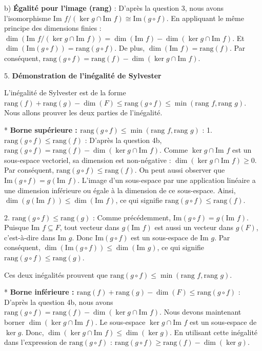 \documentclass{report}
\begin{document}
    b) \textbf{Égalité pour l'image (rang)} :
        D'après la question 3, nous avons l'isomorphisme $\text{Im } f / (\ker g \cap \text{Im } f) \cong \text{Im}(g \circ f)$.
        En appliquant le même principe des dimensions finies :
        $\dim(\text{Im } f / (\ker g \cap \text{Im } f)) = \dim(\text{Im } f) - \dim(\ker g \cap \text{Im } f)$.
        Et $\dim(\text{Im}(g \circ f)) = \text{rang}(g \circ f)$.
        De plus, $\dim(\text{Im } f) = \text{rang}(f)$.
        Par conséquent, $\text{rang}(g \circ f) = \text{rang}(f) - \dim(\ker g \cap \text{Im } f)$.

5.  \textbf{Démonstration de l'inégalité de Sylvester}

    L'inégalité de Sylvester est de la forme $\text{rang}(f) + \text{rang}(g) - \dim(F) \le \text{rang}(g \circ f) \le \min(\text{rang } f, \text{rang } g)$.
    Nous allons prouver les deux parties de l'inégalité.

    *   \textbf{Borne supérieure : $\text{rang}(g \circ f) \le \min(\text{rang } f, \text{rang } g)$} :
        1.  \textbf{$\text{rang}(g \circ f) \le \text{rang}(f)$} :
            D'après la question 4b, $\text{rang}(g \circ f) = \text{rang}(f) - \dim(\ker g \cap \text{Im } f)$.
            Comme $\ker g \cap \text{Im } f$ est un sous-espace vectoriel, sa dimension est non-négative : $\dim(\ker g \cap \text{Im } f) \ge 0$.
            Par conséquent, $\text{rang}(g \circ f) \le \text{rang}(f)$.
            On peut aussi observer que $\text{Im}(g \circ f) = g(\text{Im } f)$. L'image d'un sous-espace par une application linéaire a une dimension inférieure ou égale à la dimension de ce sous-espace. Ainsi, $\dim(g(\text{Im } f)) \le \dim(\text{Im } f)$, ce qui signifie $\text{rang}(g \circ f) \le \text{rang}(f)$.

        2.  \textbf{$\text{rang}(g \circ f) \le \text{rang}(g)$} :
            Comme précédemment, $\text{Im}(g \circ f) = g(\text{Im } f)$.
            Puisque $\text{Im } f \subseteq F$, tout vecteur dans $g(\text{Im } f)$ est aussi un vecteur dans $g(F)$, c'est-à-dire dans $\text{Im } g$.
            Donc $\text{Im}(g \circ f)$ est un sous-espace de $\text{Im } g$.
            Par conséquent, $\dim(\text{Im}(g \circ f)) \le \dim(\text{Im } g)$, ce qui signifie $\text{rang}(g \circ f) \le \text{rang}(g)$.

        Ces deux inégalités prouvent que $\text{rang}(g \circ f) \le \min(\text{rang } f, \text{rang } g)$.

    *   \textbf{Borne inférieure : $\text{rang}(f) + \text{rang}(g) - \dim(F) \le \text{rang}(g \circ f)$} :
        D'après la question 4b, nous avons $\text{rang}(g \circ f) = \text{rang}(f) - \dim(\ker g \cap \text{Im } f)$.
        Nous devons maintenant borner $\dim(\ker g \cap \text{Im } f)$.
        Le sous-espace $\ker g \cap \text{Im } f$ est un sous-espace de $\ker g$.
        Donc, $\dim(\ker g \cap \text{Im } f) \le \dim(\ker g)$.
        En utilisant cette inégalité dans l'expression de $\text{rang}(g \circ f)$ :
        $\text{rang}(g \circ f) \ge \text{rang}(f) - \dim(\ker g)$.
\end{document}
